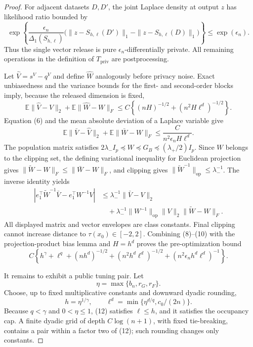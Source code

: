 \documentclass{article}
\begin{document}
\begin{proof}
For adjacent datasets \(D,D'\), the joint Laplace density at output \(z\) has likelihood ratio bounded by
\[
 \exp\left\{\frac{\epsilon_n}{\Delta_1(S_{h,\ell})}
 \bigl(\|z-S_{h,\ell}(D')\|_1-\|z-S_{h,\ell}(D)\|_1\bigr)\right\}
 \le \exp(\epsilon_n).
\]
Thus the single vector release is pure \(\epsilon_n\)-differentially private.  All remaining operations in the definition of \(T_{\mathrm{priv}}\) are postprocessing.

Let \(\widehat V=s^V-q^V\) and define \(\widehat W\) analogously before privacy noise.  Exact unbiasedness and the variance bounds for the first- and second-order blocks imply, because the released dimension is fixed,
\[
 \mathbb E\|\widehat V-V\|_2+
 \mathbb E\|\widehat W-W\|_F
 \le C\left\{(nH)^{-1/2}+(n^2H\ell^d)^{-1/2}\right\}.    \tag{8}
\]
Equation (6) and the mean absolute deviation of a Laplace variable give
\[
 \mathbb E\|\bar V-\widehat V\|_2+
 \mathbb E\|\bar W-\widehat W\|_F
 \le \frac{C}{n^2\epsilon_nH\ell^d}.                    \tag{9}
\]
The population matrix satisfies \(2\lambda_-I_p\preceq W\preceq G_B\preceq(\lambda_+/2)I_p\).  Since \(W\) belongs to the clipping set, the defining variational inequality for Euclidean projection gives
\(\|\widetilde W-W\|_F\le\|\bar W-W\|_F\), and clipping gives \(\|\widetilde W^{-1}\|_{\mathrm{op}}\le\lambda_-^{-1}\).  The inverse identity yields
\[
 \begin{aligned}
 |e_1^\top\widetilde W^{-1}\bar V-e_1^\top W^{-1}V|
 &\le \lambda_-^{-1}\|\bar V-V\|_2\\
 &\quad+\lambda_-^{-1}\|W^{-1}\|_{\mathrm{op}}\|V\|_2
       \|\widetilde W-W\|_F.
 \end{aligned}                                           \tag{10}
\]
All displayed matrix and vector envelopes are class constants.  Final clipping cannot increase distance to \(\tau(x_0)\in[-2,2]\).  Combining (8)--(10) with the projection-product bias lemma and \(H=h^d\) proves the pre-optimization bound
\[
 C\left\{h^\gamma+\ell^q+(nh^d)^{-1/2}
 +(n^2h^d\ell^d)^{-1/2}
 +(n^2\epsilon_nh^d\ell^d)^{-1}\right\}.                \tag{11}
\]

It remains to exhibit a public tuning pair.  Let
\[
 \eta=\max\{b_n,r_G,r_F\}.
\]
Choose, up to fixed multiplicative constants and downward dyadic rounding,
\[
 h=\eta^{1/\gamma},
 \qquad \ell^d=\min\{\eta^{d/q},c_0/(2n)\}.              \tag{12}
\]
Because \(q<\gamma\) and \(0<\eta\le1\), (12) satisfies \(\ell\le h\), and it satisfies the occupancy cap.  A finite dyadic grid of depth \(C\log(n+1)\), with fixed tie-breaking, contains a pair within a factor two of (12); such rounding changes only constants.


\end{proof}
\end{document}
